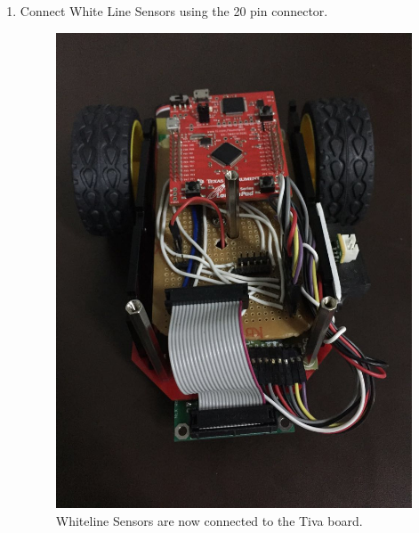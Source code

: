 \documentclass[a4paper,12pt,oneside]{book}
\begin{document}
\begin{enumerate}
\item Connect White Line Sensors using the 20 pin connector.
\begin{figure}[h]
        \centering
        \includegraphics[scale=0.16]{wh_attatched}
        \caption{Whiteline Sensors are now connected to the Tiva board.}
      \end{figure}


\end{enumerate}
\end{document}
